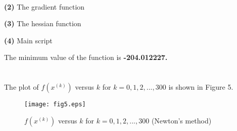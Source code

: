 \documentclass[12pt]{article}
\begin{document}

\ \\

\bigskip\noindent\textbf{(2)}  The gradient function



\bigskip\noindent\textbf{(3)}  The hessian function



\bigskip\noindent\textbf{(4)}  Main script



\bigskip\noindent The minimum value of the function is \textbf{-204.012227.}\\\\\\

\noindent The plot of $f(x^{(k)})$ versus $k$ for $k=0,1,2,...,300$ is shown in Figure 5.

\begin{figure}[!htbp]
	\centering
	\texttt{[image: fig5.eps]}      
	\caption{$f(x^{(k)})$ versus $k$ for $k=0,1,2,...,300$ (Newton's method)}
\end{figure}
\end{document}
